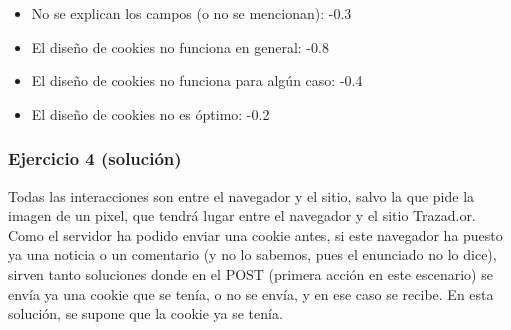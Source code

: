 \begin{itemize}
\item No se explican los campos (o no se mencionan): -0.3
\item El diseño de cookies no funciona en general: -0.8
\item El diseño de cookies no funciona para algún caso: -0.4
\item El diseño de cookies no es óptimo: -0.2
\end{itemize}

\subsubsection{Ejercicio 4 (solución)}

Todas las interacciones son entre el navegador y el sitio, salvo la que pide la imagen de un pixel, que tendrá lugar entre el navegador y el sitio Trazad.or. Como el servidor ha podido enviar una cookie antes, si este navegador ha puesto ya una noticia o un comentario (y no lo sabemos, pues el enunciado no lo dice), sirven tanto soluciones donde en el POST (primera acción en este escenario) se envía ya una cookie que se tenía, o no se envía, y en ese caso se recibe. En esta solución, se supone que la cookie ya se tenía.

